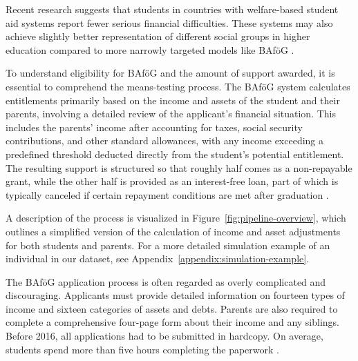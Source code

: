 Recent research suggests that students in countries with welfare-based student aid systems report fewer serious financial difficulties. These systems may also achieve slightly better representation of different social groups in higher education compared to more narrowly targeted models like BAföG  \citep{gwosc_krisenbewaltigung_2022}.

To understand eligibility for BAföG and the amount of support awarded, it is essential to comprehend the means-testing process. The BAföG system calculates entitlements primarily based on the income and assets of the student and their parents, involving a detailed review of the applicant’s financial situation. This includes the parents’ income after accounting for taxes, social security contributions, and other standard allowances, with any income exceeding a predefined threshold deducted directly from the student’s potential entitlement. The resulting support is structured so that roughly half comes as a non-repayable grant, while the other half is provided as an interest-free loan, part of which is typically canceled if certain repayment conditions are met after graduation \citep{herber_non-take-up_2019}.

A description of the process is visualized in Figure~\ref{fig:pipeline-overview}, which outlines a simplified version of the calculation of income and asset adjustments for both students and parents. For a more detailed simulation example of an individual in our dataset, see Appendix~\ref{appendix:simulation-example}.

The BAföG application process is often regarded as overly complicated and discouraging. Applicants must provide detailed information on fourteen types of income and sixteen categories of assets and debts. Parents are also required to complete a comprehensive four-page form about their income and any siblings. Before 2016, all applications had to be submitted in hardcopy. On average, students spend more than five hours completing the paperwork \citep{fidan_why_2021}.

